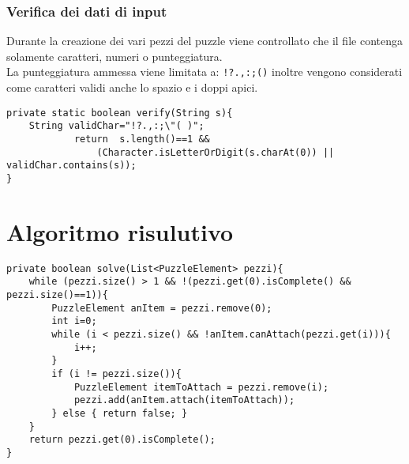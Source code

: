 \documentclass[a4paper, 11pt]{article}
\begin{document}
\subsubsection{Verifica dei dati di input}
Durante la creazione dei vari pezzi del puzzle viene controllato che il file contenga solamente caratteri, numeri o punteggiatura.\\
La punteggiatura ammessa viene limitata a: \texttt{!?.,:;()} inoltre vengono considerati come caratteri validi anche lo spazio e i doppi apici.
\begin{lstlisting}
private static boolean verify(String s){
	String validChar="!?.,:;\"( )";
    		return 	s.length()==1 &&
				(Character.isLetterOrDigit(s.charAt(0)) || validChar.contains(s));
}
\end{lstlisting}
\pagebreak
\section{Algoritmo risulutivo}
\begin{lstlisting}
private boolean solve(List<PuzzleElement> pezzi){
	while (pezzi.size() > 1 && !(pezzi.get(0).isComplete() && pezzi.size()==1)){
		PuzzleElement anItem = pezzi.remove(0);
		int i=0;
		while (i < pezzi.size() && !anItem.canAttach(pezzi.get(i))){
			i++;
		}
		if (i != pezzi.size()){
			PuzzleElement itemToAttach = pezzi.remove(i);
			pezzi.add(anItem.attach(itemToAttach));
		} else { return false; }
	}
	return pezzi.get(0).isComplete();
}
\end{lstlisting}
\end{document}
